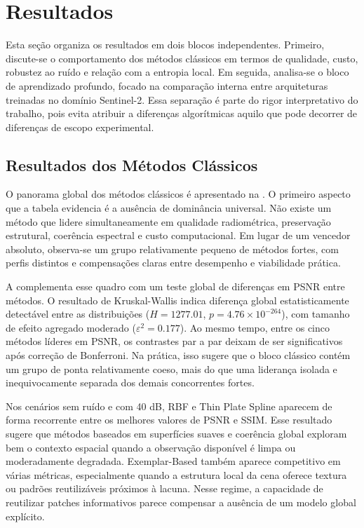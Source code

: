 \section{Resultados}
\label{sec:results}

Esta seção organiza os resultados em dois blocos independentes.
Primeiro, discute-se o comportamento dos métodos clássicos em termos de qualidade, custo, robustez ao ruído e relação com a entropia local.
Em seguida, analisa-se o bloco de aprendizado profundo, focado na comparação interna entre arquiteturas treinadas no domínio Sentinel-2.
Essa separação é parte do rigor interpretativo do trabalho, pois evita atribuir a diferenças algorítmicas aquilo que pode decorrer de diferenças de escopo experimental.

\subsection{Resultados dos Métodos Clássicos}

O panorama global dos métodos clássicos é apresentado na .
O primeiro aspecto que a tabela evidencia é a ausência de dominância universal.
Não existe um método que lidere simultaneamente em qualidade radiométrica, preservação estrutural, coerência espectral e custo computacional.
Em lugar de um vencedor absoluto, observa-se um grupo relativamente pequeno de métodos fortes, com perfis distintos e compensações claras entre desempenho e viabilidade prática.




A  complementa esse quadro com um teste global de diferenças em \gls{PSNR} entre métodos.
O resultado de Kruskal-Wallis indica diferença global estatisticamente detectável entre as distribuições ($H=1277.01$, $p=4.76\times10^{-264}$), com tamanho de efeito agregado moderado ($\varepsilon^2=0.177$).
Ao mesmo tempo, entre os cinco métodos líderes em \gls{PSNR}, os contrastes par a par deixam de ser significativos após correção de Bonferroni.
Na prática, isso sugere que o bloco clássico contém um grupo de ponta relativamente coeso, mais do que uma liderança isolada e inequivocamente separada dos demais concorrentes fortes.

Nos cenários sem ruído e com 40 dB, \gls{RBF} e Thin Plate Spline aparecem de forma recorrente entre os melhores valores de \gls{PSNR} e \gls{SSIM}.
Esse resultado sugere que métodos baseados em superfícies suaves e coerência global exploram bem o contexto espacial quando a observação disponível é limpa ou moderadamente degradada.
Exemplar-Based também aparece competitivo em várias métricas, especialmente quando a estrutura local da cena oferece textura ou padrões reutilizáveis próximos à lacuna.
Nesse regime, a capacidade de reutilizar patches informativos parece compensar a ausência de um modelo global explícito.

